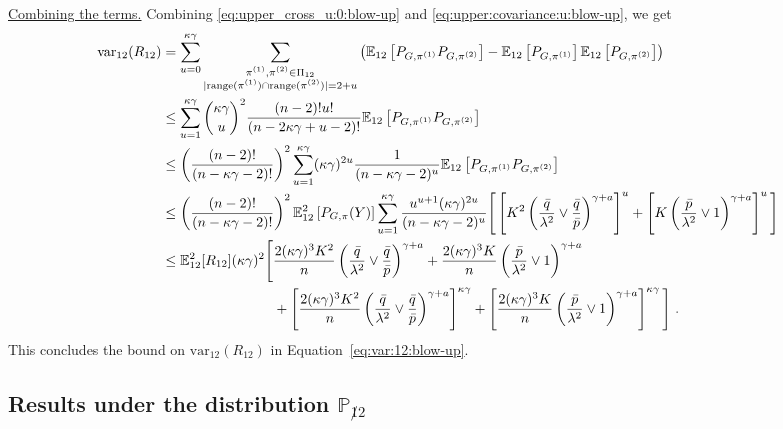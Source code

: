 \documentclass[final]{colt2026}
\newcommand{\1}{\mathbf{1}}
\newcommand{\bbE}{\mathbb{E}}
\newcommand{\bbP}{\mathbb{P}}
\newcommand{\pa}[1]{\left(#1\right)}
\newcommand{\cro}[1]{\left[#1\right]}
\begin{document}
\noindent\underline{Combining the terms.}
Combining \eqref{eq:upper_cross_u:0:blow-up} and  \eqref{eq:upper:covariance:u:blow-up}, we get 
\begin{align*}
\text{var}_{12}(R_{12}) &= \sum_{u=0}^{\kappa \gamma} \sum_{\substack{\pi^{(1)},\pi^{(2)}\in \Pi_{12}\\ |\text{range}(\pi^{(1)})\cap \text{range}(\pi^{(2)})|=2+u}}
\pa{\bbE_{12}\cro{P_{G,\pi^{(1)}}P_{G,\pi^{(2)}}}-\bbE_{12}\cro{P_{G,\pi^{(1)}}}\bbE_{12}\cro{P_{G,\pi^{(2)}}}}\\
& \leq   \sum_{u=1}^{\kappa \gamma}   \binom{\kappa \gamma}{u}^{2} {(n-2)!u!\over (n-2\kappa\gamma+u - 2)!}  \bbE_{12}\cro{P_{G,\pi^{(1)}}P_{G,\pi^{(2)}}}\\
&\leq \left(\frac{(n-2)!}{(n-\kappa \gamma-2)!}\right)^2\sum_{u=1}^{\kappa \gamma} (\kappa \gamma)^{2u}  \frac{1}{(n-\kappa \gamma-2)^u}\bbE_{12}\cro{P_{G,\pi^{(1)}}P_{G,\pi^{(2)}}} \\ 
&\leq \left(\frac{(n-2)!}{(n-\kappa \gamma-2)!}\right)^2 \bbE^2_{12}\cro{P_{G,\pi}(Y)}\sum_{u=1}^{\kappa\gamma } \frac{u^{u+1}(\kappa \gamma)^{2u} } {(n-\kappa \gamma-2)^u} \Bigg[\left[K^2  \left(\frac{\bar{q}}{\lambda^2}\vee \frac{\bar{q}}{\bar p } \right)^{\gamma + a}\right]^u  + \left[K \left(\frac{\bar{p}}{\lambda^2}\vee 1 \right)^{\gamma + a}\right]^u   \Bigg]\\
&\leq \bbE^2_{12}[R_{12}](\kappa\gamma)^2 \Bigg[\frac{2(\kappa \gamma)^{3} K^2 } {n}  \left(\frac{\bar{q}}{\lambda^2}\vee \frac{\bar{q}}{\bar p } \right)^{\gamma + a}  + \frac{2(\kappa \gamma)^{3} K } {n} \left(\frac{\bar{p}}{\lambda^2}\vee 1 \right)^{\gamma + a} \\& \quad\quad\quad \quad \quad \quad \quad \quad   + \left[\frac{2(\kappa \gamma)^{3} K^2 } {n}   \left(\frac{\bar{q}}{\lambda^2}\vee \frac{\bar{q}}{\bar p } \right)^{\gamma + a}\right]^{\kappa \gamma}  + \left[\frac{2(\kappa \gamma)^{3} K } {n} \left(\frac{\bar{p}}{\lambda^2}\vee 1 \right)^{\gamma + a}\right]^{\kappa \gamma}   \Bigg] \ . 
\end{align*}
This concludes the bound on $\mathrm{var}_{12}(R_{12})$ in Equation~\eqref{eq:var:12:blow-up}. 



\subsection{Results under the distribution $\bbP_{\not 12}$}
\end{document}
